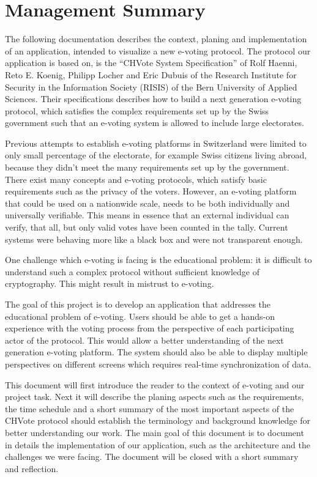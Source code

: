 \chapter*{Management Summary}
The following documentation describes the context, planing and implementation of an application, intended to visualize a new e-voting protocol. The protocol our application is based on, is the "`CHVote System Specification"' of Rolf Haenni, Reto E. Koenig, Philipp Locher and Eric Dubuis of the Research Institute for Security in the Information Society (RISIS) of the Bern University of Applied Sciences. Their specifications describes how to build a next generation e-voting protocol, which satisfies the complex requirements set up by the Swiss government such that an e-voting system is allowed to include large electorates.

Previous attempts to establish e-voting platforms in Switzerland were limited to only small percentage of the electorate, for example Swiss citizens living abroad, because they didn't meet the many requirements set up by the government. There exist many concepts and e-voting protocols, which satisfy basic requirements such as the privacy of the voters. However, an e-voting platform that could be used on a nationwide scale, needs to be both individually and universally verifiable. This means in essence that an external individual can verify, that all, but only valid votes have been counted in the tally. Current systems were behaving more like a black box and were not transparent enough.

One challenge which e-voting is facing is the educational problem: it is difficult to understand such a complex protocol without sufficient knowledge of cryptography. This might result in mistrust to e-voting.

The goal of this project is to develop an application that addresses the educational problem of e-voting. Users should be able to get a hands-on experience with the voting process from the perspective of each participating actor of the protocol. This would allow a better understanding of the next generation e-voting platform. The system should also be able to display multiple perspectives on different screens which requires real-time synchronization of data.

This document will first introduce the reader to the context of e-voting and our project task. Next it will describe the planing aspects such as the requirements, the time schedule and a short summary of the most important aspects of the CHVote protocol should establish the terminology and background knowledge for better understanding our work. The main goal of this document is to document in details the implementation of our application, such as the architecture and the challenges we were facing. The document will be closed with a short summary and reflection.
